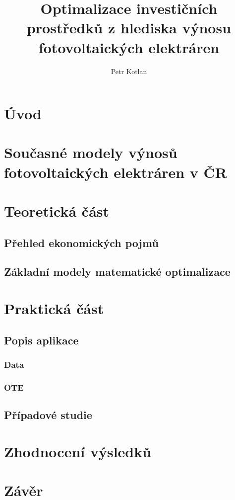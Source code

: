 \documentclass[a4paper, 12pt]{report}
\author{Petr Kotlan}
\title{Optimalizace investičních prostředků z hlediska
výnosu fotovoltaických elektráren}
\date{}
\begin{document}



\tableofcontents

\chapter*{Úvod}

\chapter{Současné modely výnosů fotovoltaických elektráren v ČR}

\chapter{Teoretická část}

\section{Přehled ekonomických pojmů}

\section{Základní modely matematické optimalizace}

\chapter{Praktická část}

\section{Popis aplikace}

\subsection{Data}

\subsection*{OTE}


\section{Případové studie}

\chapter{Zhodnocení výsledků}

\chapter*{Závěr}
\end{document}

